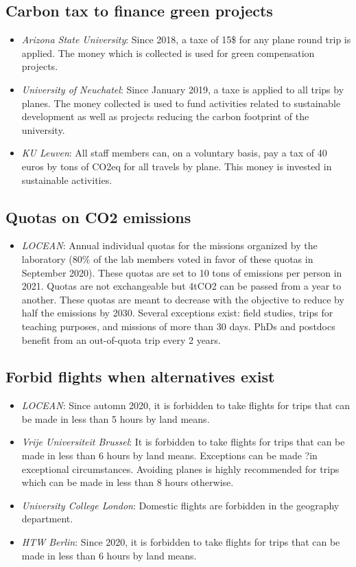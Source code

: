 \documentclass[version=3.21, pagesize, twoside=off, bibliography=totoc, DIV=calc, fontsize=12pt, a4paper, french, english]{scrartcl}
\begin{document}
\subsection{Carbon tax to finance green projects}
\begin{itemize}
\item \emph{Arizona State University}: Since 2018, a taxe of 15\$ for any plane round trip is applied. The money which is collected is used for green compensation projects.
\item \emph{University of Neuchatel}: Since January 2019, a taxe is applied to all trips by planes. The money collected is used to fund activities related to sustainable development as well as projects reducing the carbon footprint of the university.
\item \emph{KU Leuven}: All staff members can, on a voluntary basis, pay a tax of 40 euros by tons of CO2eq for all travels by plane. This money is invested in sustainable activities.
\end{itemize}

\subsection{Quotas on CO2 emissions}
\begin{itemize}
\item \emph{LOCEAN}: Annual individual quotas for the missions organized by the laboratory ($80\%$ of the lab members voted in favor of these quotas in September 2020). These quotas are set to 10 tons of emissions per person in 2021. Quotas are not exchangeable but 4tCO2 can be passed from a year to another. These quotas are meant to decrease with the objective to reduce by half the emissions by 2030. Several exceptions exist: field studies, trips for teaching purposes, and missions of more than 30 days. PhDs and postdocs benefit from an out-of-quota trip every 2 years.
\end{itemize}

\subsection{Forbid flights when alternatives exist}
\begin{itemize}
\item \emph{LOCEAN}: Since automn 2020, it is forbidden to take flights for trips that can be made in less than 5 hours by land means. 
\item \emph{Vrije Universiteit Brussel}: It is forbidden to take flights for trips that can be made in less than 6 hours by land means. Exceptions can be made ?in exceptional circumstances. Avoiding planes is highly recommended for trips which can be made in less than 8 hours otherwise. 
\item \emph{University College London}: Domestic flights are forbidden in the geography department. 
\item \emph{HTW Berlin}: Since 2020, it is forbidden to take flights for trips that can be made in less than 6 hours by land means.
\end{itemize}
\end{document}
